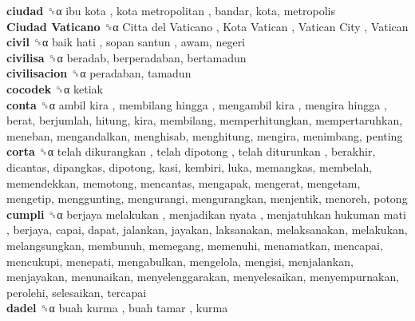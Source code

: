 \textbf{ciudad} ␝α   ibu kota ,  kota metropolitan , bandar, kota, metropolis  \\
\textbf{Ciudad Vaticano} ␝α   Citta del Vaticano ,  Kota Vatican ,  Vatican City ,  Vatican   \\
\textbf{civil} ␝α   baik hati ,  sopan santun , awam, negeri  \\
\textbf{civilisa} ␝α  beradab, berperadaban, bertamadun  \\
\textbf{civilisacion} ␝α  peradaban, tamadun  \\
\textbf{cocodek} ␝α  ketiak  \\
\textbf{conta} ␝α   ambil kira ,  membilang hingga ,  mengambil kira ,  mengira hingga , berat, berjumlah, hitung, kira, membilang, memperhitungkan, mempertaruhkan, meneban, mengandalkan, menghisab, menghitung, mengira, menimbang, penting  \\
\textbf{corta} ␝α   telah dikurangkan ,  telah dipotong ,  telah diturunkan , berakhir, dicantas, dipangkas, dipotong, kasi, kembiri, luka, memangkas, membelah, memendekkan, memotong, mencantas, mengapak, mengerat, mengetam, mengetip, menggunting, mengurangi, mengurangkan, menjentik, menoreh, potong  \\
\textbf{cumpli} ␝α   berjaya melakukan ,  menjadikan nyata ,  menjatuhkan hukuman mati , berjaya, capai, dapat, jalankan, jayakan, laksanakan, melaksanakan, melakukan, melangsungkan, membunuh, memegang, memenuhi, menamatkan, mencapai, mencukupi, menepati, mengabulkan, mengelola, mengisi, menjalankan, menjayakan, menunaikan, menyelenggarakan, menyelesaikan, menyempurnakan, perolehi, selesaikan, tercapai  \\
\textbf{dadel} ␝α   buah kurma ,  buah tamar , kurma  \\
